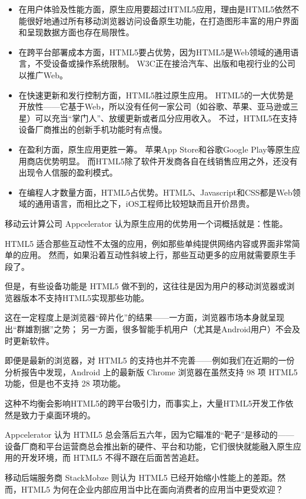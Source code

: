 \begin{itemize}
\item 在用户体验及性能方面，原生应用要超过HTML5应用，理由是HTML5依然不能很好地通过所有移动浏览器访问设备原生功能，在打造图形丰富的用户界面和呈现数据方面也存在局限性。

\item 在跨平台部署成本方面，HTML5要占优势，因为HTML5是Web领域的通用语言，不受设备或操作系统限制。
W3C正在接洽汽车、出版和电视行业的公司以推广Web。

\item 在快速更新和发行控制方面，HTML5胜过原生应用。
HTML5的一大优势是开放性——它基于Web，所以没有任何一家公司（如谷歌、苹果、亚马逊或三星）可以充当“掌门人”、放缓更新或者瓜分应用收入。
不过，HTML5在支持设备厂商推出的创新手机功能时有点慢。

\item 在盈利方面，原生应用更胜一筹。
苹果App Store和谷歌Google Play等原生应用商店优势明显。
而HTML5除了软件开发商各自在线销售应用之外，还没有出现令人信服的盈利模式。

\item 在编程人才数量方面，HTML5占优势。HTML5、Javascript和CSS都是Web领域的通用语言，而相比之下，iOS工程师比较短缺而且开价昂贵。
\end{itemize}

移动云计算公司 Appcelerator 认为原生应用的优势用一个词概括就是：性能。

HTML5 适合那些互动性不太强的应用，例如那些单纯提供网络内容或界面非常简单的应用。
然而，如果沿着互动性斜坡上行，那些互动更多的应用就需要原生手段了。

但是，有些设备功能是 HTML5 做不到的，这往往是因为用户的移动浏览器或浏览器版本不支持HTML5实现那些功能。

这在一定程度上是浏览器“碎片化”的结果——一方面，浏览器市场本身就呈现出“群雄割据”之势；
另一方面，很多智能手机用户（尤其是Android用户）不会及时更新软件。

即便是最新的浏览器，对 HTML5 的支持也并不完善——例如我们在近期的一份分析报告中发现，Android 上的最新版 Chrome 浏览器在虽然支持 98 项 HTML5 功能，但是也不支持 28 项功能。

这种不均衡会影响HTML5的跨平台吸引力，而事实上，大量HTML5开发工作依然是致力于桌面环境的。

Appcelerator 认为 HTML5 总会落后五六年，因为它瞄准的“靶子”是移动的——设备厂商和平台运营商总会推出新的硬件、平台和功能，它们很快就能融入原生应用的开发环境，而 HTML5 不得不跟在后面苦苦追赶。

移动后端服务商 StackMobze 则认为 HTML5 已经开始缩小性能上的差距。然而，HTML5 为何在企业内部应用当中比在面向消费者的应用当中更受欢迎？

